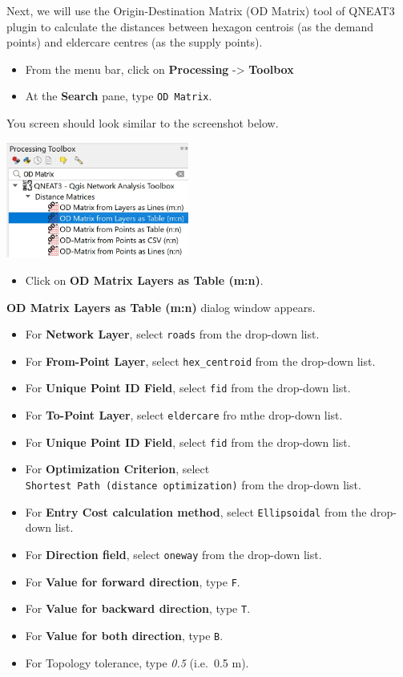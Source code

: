 \documentclass[
  letterpaper,
  DIV=11,
  numbers=noendperiod]{scrreprt}
\providecommand{\tightlist}{%
  \setlength{\itemsep}{0pt}\setlength{\parskip}{0pt}}\usepackage{longtable,booktabs,array}
\begin{document}
Next, we will use the Origin-Destination Matrix (OD Matrix) tool of
QNEAT3 plugin to calculate the distances between hexagon centrois (as
the demand points) and eldercare centres (as the supply points).

\begin{itemize}
\item
  From the menu bar, click on \textbf{Processing} -\textgreater{}
  \textbf{Toolbox}
\item
  At the \textbf{Search} pane, type \texttt{OD\ Matrix}.
\end{itemize}

You screen should look similar to the screenshot below.

\includegraphics[width=0.45\textwidth,height=\textheight]{./img09/image26.jpg}

\begin{itemize}
\tightlist
\item
  Click on \textbf{OD Matrix Layers as Table (m:n)}.
\end{itemize}

\textbf{OD Matrix Layers as Table (m:n)} dialog window appears.

\begin{itemize}
\item
  For \textbf{Network Layer}, select \texttt{roads} from the drop-down
  list.
\item
  For \textbf{From-Point Layer}, select \texttt{hex\_centroid} from the
  drop-down list.
\item
  For \textbf{Unique Point ID Field}, select \texttt{fid} from the
  drop-down list.
\item
  For \textbf{To-Point Layer}, select \texttt{eldercare} fro mthe
  drop-down list.
\item
  For \textbf{Unique Point ID Field}, select \texttt{fid} from the
  drop-down list.
\item
  For \textbf{Optimization Criterion}, select
  \texttt{Shortest\ Path\ (distance\ optimization)} from the drop-down
  list.
\item
  For \textbf{Entry Cost calculation method}, select
  \texttt{Ellipsoidal} from the drop-down list.
\item
  For \textbf{Direction field}, select \texttt{oneway} from the
  drop-down list.
\item
  For \textbf{Value for forward direction}, type \texttt{F}.
\item
  For \textbf{Value for backward direction}, type \texttt{T}.
\item
  For \textbf{Value for both direction}, type \texttt{B}.
\item
  For Topology tolerance, type \emph{0.5} (i.e.~0.5 m).
\end{itemize}
\end{document}

